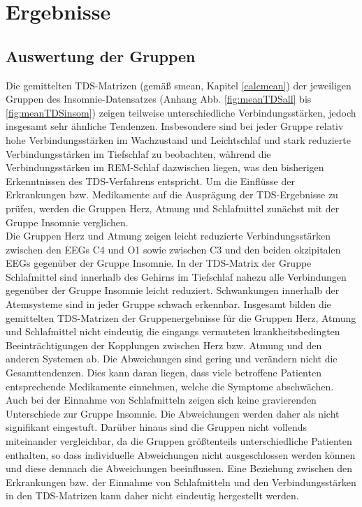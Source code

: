 \chapter{Ergebnisse}

\section{Auswertung der Gruppen}

Die gemittelten \acs{TDS}-Matrizen (gemäß smean, Kapitel \ref{calcmean}) der jeweiligen Gruppen des Insomnie-Datensatzes (Anhang Abb. \ref{fig:meanTDSall} bis \ref{fig:meanTDSinsom}) zeigen teilweise unterschiedliche Verbindungsstärken, jedoch insgesamt sehr ähnliche Tendenzen. Insbesondere sind bei jeder Gruppe relativ hohe Verbindungsstärken im Wachzustand und Leichtschlaf und stark reduzierte Verbindungsstärken im Tiefschlaf zu beobachten, während die Verbindungsstärken im \acs{REM}-Schlaf dazwischen liegen, was den bisherigen Erkenntnissen des \acs{TDS}-Verfahrens entspricht. Um die Einflüsse der Erkrankungen bzw. Medikamente auf die Ausprägung der \acs{TDS}-Ergebnisse zu prüfen, werden die Gruppen Herz, Atmung und Schlafmittel zunächst mit der Gruppe Insomnie verglichen.\\

Die Gruppen Herz und Atmung zeigen leicht reduzierte Verbindungsstärken zwischen den \acs{EEG}s C4 und O1 sowie zwischen C3 und den beiden okzipitalen \acs{EEG}s gegenüber der Gruppe Insomnie. In der \acs{TDS}-Matrix der Gruppe Schlafmittel sind innerhalb des Gehirns im Tiefschlaf nahezu alle Verbindungen gegenüber der Gruppe Insomnie leicht reduziert. Schwankungen innerhalb der Atemsysteme sind in jeder Gruppe schwach erkennbar. Insgesamt bilden die gemittelten \acs{TDS}-Matrizen der Gruppenergebnisse für die Gruppen Herz, Atmung und Schlafmittel nicht eindeutig die eingangs vermuteten krankheitsbedingten Beeinträchtigungen der Kopplungen zwischen Herz bzw. Atmung und den anderen Systemen ab. Die Abweichungen sind gering und verändern nicht die Gesamttendenzen. Dies kann daran liegen, dass viele betroffene Patienten entsprechende Medikamente einnehmen, welche die Symptome abschwächen. Auch bei der Einnahme von Schlafmitteln zeigen sich keine gravierenden Unterschiede zur Gruppe Insomnie. Die Abweichungen werden daher als nicht signifikant eingestuft. Darüber hinaus sind die Gruppen nicht vollends miteinander vergleichbar, da die Gruppen größtenteils unterschiedliche Patienten enthalten, so dass individuelle Abweichungen nicht ausgeschlossen werden können und diese demnach die Abweichungen beeinflussen. Eine Beziehung zwischen den Erkrankungen bzw. der Einnahme von Schlafmitteln und den Verbindungsstärken in den \acs{TDS}-Matrizen kann daher nicht eindeutig hergestellt werden. \\

